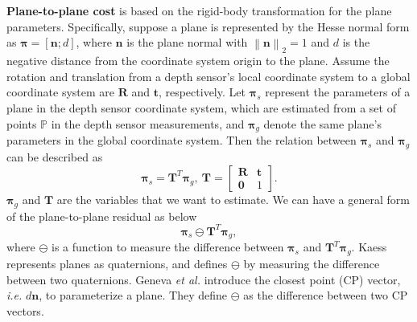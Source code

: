 \documentclass{vgtc}                          %
\begin{document}
\textbf{Plane-to-plane cost} is based on the rigid-body transformation for the  plane parameters. 
Specifically, suppose  a plane is represented by the Hesse normal form as $\bm{\pi} = \left[ \mathbf{n}; d\right] $, where $\mathbf{n}$ is the plane normal with  $\left\| \mathbf{n}\right\|_2 =1 $  and $d$ is the negative distance from the coordinate system origin to the plane. Assume the rotation and translation from a depth  sensor's local coordinate system to a global coordinate system are $\mathbf{R}$ and $\mathbf{t}$, respectively. Let $\bm{\pi}_s $ represent the parameters of a plane in the depth sensor coordinate system,   which are estimated from a set of points $\mathbb{P}$  in the depth sensor measurements,  and $\bm{\pi}_g$  denote  the same plane's parameters in the global coordinate system. Then the relation between $\bm{\pi}_s $  and $\bm{\pi}_g $  can be described as \cite{hartley2003multiple}
\begin{equation} \label{equ_pl2pl}
	\bm{\pi}_s = \mathbf{T}^{T}\bm{\pi}_g, \ \mathbf{T} = 
	\begin{bmatrix}
		\mathbf{R} & \mathbf{t} \\
		\mathbf{0} & 1
	\end{bmatrix}.
\end{equation}
$\bm{\pi}_g $  and $\mathbf{T}$ are  the variables that we want to estimate. We can have a general form  of the  plane-to-plane residual as below
\begin{equation} \label{equ_pl2pl_diff}
	\bm{\pi}_s  \ominus \mathbf{T}^{T}\bm{\pi}_g,
\end{equation}
where $\ominus$ is a function to measure the difference between $\bm{\pi}_s $ and $\mathbf{T}^{T}\bm{\pi}_g$. Kaess \cite{kaess2015simultaneous}  represents  planes as quaternions, and defines $\ominus$ by measuring the difference between two quaternions. Geneva \textit{et al.} \cite{geneva2018lips} introduce the closest point (CP) vector, \textit{i.e.} $d\mathbf{n}$,  to parameterize a plane.  They define $\ominus$ as the difference between two CP vectors.
\end{document}
